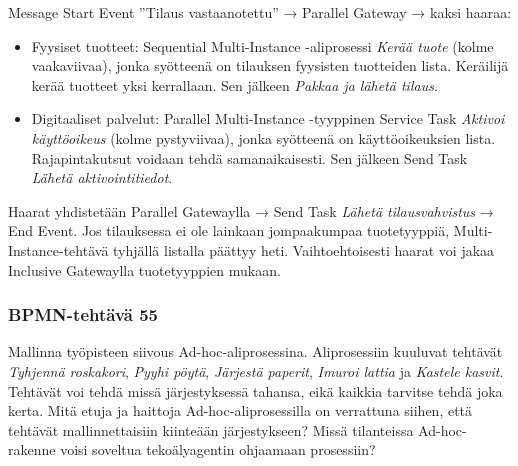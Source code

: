 \documentclass[
  finnish,
  letterpaper,
  DIV=11,
  numbers=noendperiod,
  oneside]{scrreprt}
\providecommand{\tightlist}{%
  \setlength{\itemsep}{0pt}\setlength{\parskip}{0pt}}
\begin{document}
\begin{tcolorbox}[enhanced jigsaw, arc=.35mm, bottomrule=.15mm, bottomtitle=1mm, breakable, colback=white, colbacktitle=quarto-callout-tip-color!10!white, colframe=quarto-callout-tip-color-frame, coltitle=black, left=2mm, leftrule=.75mm, opacityback=0, opacitybacktitle=0.6, rightrule=.15mm, title=\textcolor{quarto-callout-tip-color}{\faLightbulb}\hspace{0.5em}{Malliratkaisu}, titlerule=0mm, toprule=.15mm, toptitle=1mm]

Message Start Event ''Tilaus vastaanotettu'' → Parallel Gateway → kaksi
haaraa:

\begin{itemize}
\tightlist
\item
  Fyysiset tuotteet: Sequential Multi-Instance -aliprosessi \emph{Kerää
  tuote} (kolme vaakaviivaa), jonka syötteenä on tilauksen fyysisten
  tuotteiden lista. Keräilijä kerää tuotteet yksi kerrallaan. Sen
  jälkeen \emph{Pakkaa ja lähetä tilaus}.
\item
  Digitaaliset palvelut: Parallel Multi-Instance -tyyppinen Service Task
  \emph{Aktivoi käyttöoikeus} (kolme pystyviivaa), jonka syötteenä on
  käyttöoikeuksien lista. Rajapintakutsut voidaan tehdä samanaikaisesti.
  Sen jälkeen Send Task \emph{Lähetä aktivointitiedot}.
\end{itemize}

Haarat yhdistetään Parallel Gatewaylla → Send Task \emph{Lähetä
tilausvahvistus} → End Event. Jos tilauksessa ei ole lainkaan
jompaakumpaa tuotetyyppiä, Multi-Instance-tehtävä tyhjällä listalla
päättyy heti. Vaihtoehtoisesti haarat voi jakaa Inclusive Gatewaylla
tuotetyyppien mukaan.

\end{tcolorbox}

\subsubsection{BPMN-tehtävä 55}\label{bpmn-tehtuxe4vuxe4-55}

Mallinna työpisteen siivous Ad-hoc-aliprosessina. Aliprosessiin kuuluvat
tehtävät \emph{Tyhjennä roskakori}, \emph{Pyyhi pöytä}, \emph{Järjestä
paperit}, \emph{Imuroi lattia} ja \emph{Kastele kasvit}. Tehtävät voi
tehdä missä järjestyksessä tahansa, eikä kaikkia tarvitse tehdä joka
kerta. Mitä etuja ja haittoja Ad-hoc-aliprosessilla on verrattuna
siihen, että tehtävät mallinnettaisiin kiinteään järjestykseen? Missä
tilanteissa Ad-hoc-rakenne voisi soveltua tekoälyagentin ohjaamaan
prosessiin?
\end{document}
